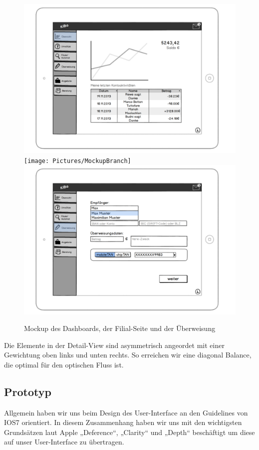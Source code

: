 \begin{figure}[p]
	\centering
	\includegraphics[scale=.52]{Pictures/MockupDashboard}\\
	\texttt{[image: Pictures/MockupBranch]}\\
	\includegraphics[scale=.52]{Pictures/MockupTransition}
	\caption{Mockup des Dashboards, der Filial-Seite und der Überweisung}
\end{figure}

	Die Elemente in der Detail-View sind asymmetrisch angeordet mit einer Gewichtung oben links und unten rechts. So erreichen wir eine diagonal Balance, die optimal für den optischen Fluss ist.

\subsection{Prototyp}
	Allgemein haben wir uns beim Design des User-Interface an den Guidelines von IOS7 orientiert. In diesem Zusammenhang haben wir uns mit den wichtigsten Grundsätzen laut Apple „Deference“, „Clarity“ und „Depth“ beschäftigt um diese auf unser User-Interface zu übertragen. 
	
